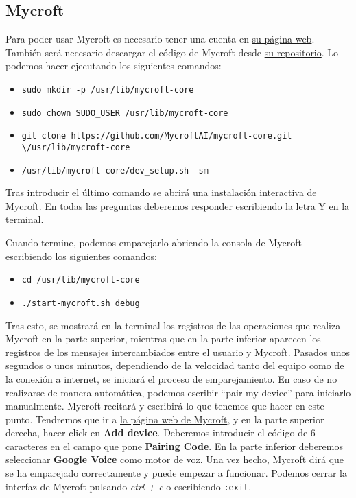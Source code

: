 \subsection{Mycroft}
Para poder usar Mycroft es necesario tener una cuenta en \href{https://mycroft.ai}{su página web}. También será necesario descargar el código de Mycroft desde \href{https://github.com/MycroftAI/mycroft-core}{su repositorio}. Lo podemos hacer ejecutando los siguientes comandos:
\begin{itemize}
    \item \texttt{sudo mkdir -p /usr/lib/mycroft-core}
    \item \texttt{sudo chown SUDO\_USER /usr/lib/mycroft-core}
    \item \texttt{git clone https://github.com/MycroftAI/mycroft-core.git \textbackslash\newline /usr/lib/mycroft-core}
    \item \texttt{/usr/lib/mycroft-core/dev\_setup.sh -sm}
\end{itemize}
Tras introducir el último comando se abrirá una instalación interactiva de Mycroft. En todas las preguntas deberemos responder escribiendo la letra Y en la terminal.

Cuando termine, podemos emparejarlo abriendo la consola de Mycroft escribiendo los siguientes comandos:
\begin{itemize}
    \item \texttt{cd /usr/lib/mycroft-core}
    \item \texttt{./start-mycroft.sh debug}
\end{itemize}

Tras esto, se mostrará en la terminal los registros de las operaciones que realiza Mycroft en la parte superior, mientras que en la parte inferior aparecen los registros de los mensajes intercambiados entre el usuario y Mycroft. Pasados unos segundos o unos minutos, dependiendo de la velocidad tanto del equipo como de la conexión a internet, se iniciará el proceso de emparejamiento. En caso de no realizarse de manera automática, podemos escribir ``pair my device'' para iniciarlo manualmente.
Mycroft recitará y escribirá lo que tenemos que hacer en este punto. Tendremos que ir a \href{https://mycroft.ai}{la página web de Mycroft}, y en la parte superior derecha, hacer click en \textbf{Add device}. Deberemos introducir el código de 6 caracteres en el campo que pone \textbf{Pairing Code}. En la parte inferior deberemos seleccionar \textbf{Google Voice} como motor de voz.
Una vez hecho, Mycroft dirá que se ha emparejado correctamente y puede empezar a funcionar. Podemos cerrar la interfaz de Mycroft pulsando \textit{ctrl + c} o escribiendo \texttt{:exit}.

